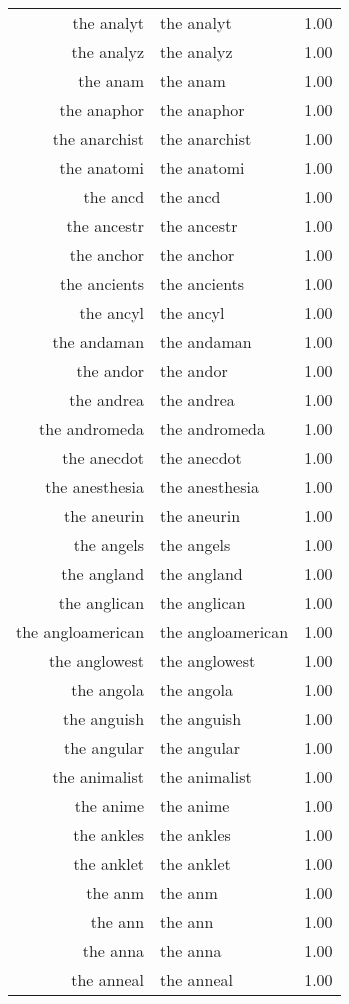 \begin{table}[ht]
\begin{tabular}{rlr}
  the analyt & the analyt & 1.00 \\ 
  the analyz & the analyz & 1.00 \\ 
  the anam & the anam & 1.00 \\ 
  the anaphor & the anaphor & 1.00 \\ 
  the anarchist & the anarchist & 1.00 \\ 
  the anatomi & the anatomi & 1.00 \\ 
  the ancd & the ancd & 1.00 \\ 
  the ancestr & the ancestr & 1.00 \\ 
  the anchor & the anchor & 1.00 \\ 
  the ancients & the ancients & 1.00 \\ 
  the ancyl & the ancyl & 1.00 \\ 
  the andaman & the andaman & 1.00 \\ 
  the andor & the andor & 1.00 \\ 
  the andrea & the andrea & 1.00 \\ 
  the andromeda & the andromeda & 1.00 \\ 
  the anecdot & the anecdot & 1.00 \\ 
  the anesthesia & the anesthesia & 1.00 \\ 
  the aneurin & the aneurin & 1.00 \\ 
  the angels & the angels & 1.00 \\ 
  the angland & the angland & 1.00 \\ 
  the anglican & the anglican & 1.00 \\ 
  the angloamerican & the angloamerican & 1.00 \\ 
  the anglowest & the anglowest & 1.00 \\ 
  the angola & the angola & 1.00 \\ 
  the anguish & the anguish & 1.00 \\ 
  the angular & the angular & 1.00 \\ 
  the animalist & the animalist & 1.00 \\ 
  the anime & the anime & 1.00 \\ 
  the ankles & the ankles & 1.00 \\ 
  the anklet & the anklet & 1.00 \\ 
  the anm & the anm & 1.00 \\ 
  the ann & the ann & 1.00 \\ 
  the anna & the anna & 1.00 \\ 
  the anneal & the anneal & 1.00 \\ 

\end{tabular}
\end{table}
